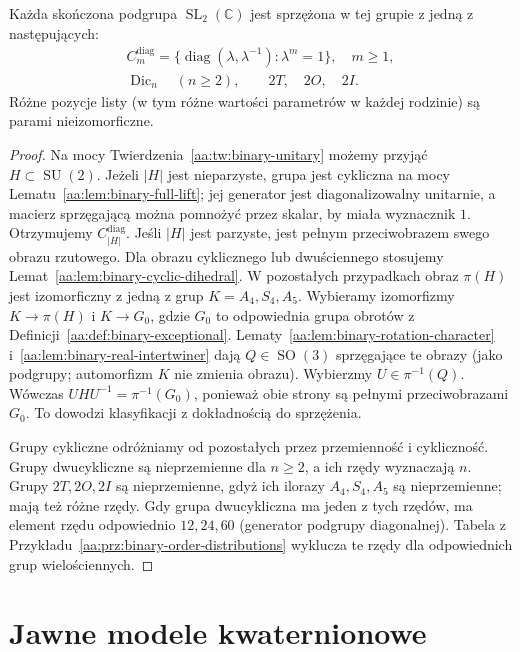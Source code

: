 \begin{twierdzenie}
\label{aa:tw:binary-classification}
Każda skończona podgrupa $\operatorname{SL}_2(\mathbb C)$
jest sprzężona w tej grupie z jedną z następujących:
\[
\begin{gathered}
 C_m^{\mathrm{diag}}=
 \{\operatorname{diag}(\lambda,\lambda^{-1}):\lambda^m=1\},
 \quad m\ge1,\\
 \operatorname{Dic}_n\quad(n\ge2),\qquad 2T,\quad 2O,\quad 2I.
\end{gathered}
\]
Różne pozycje listy (w tym różne wartości parametrów
w każdej rodzinie) są parami nieizomorficzne.
\end{twierdzenie}
\begin{proof}
Na mocy Twierdzenia~\ref{aa:tw:binary-unitary}
możemy przyjąć $H\subset\operatorname{SU}(2)$.
Jeżeli $|H|$ jest nieparzyste, grupa jest cykliczna
na mocy Lematu~\ref{aa:lem:binary-full-lift}; jej generator
jest diagonalizowalny unitarnie, a macierz sprzęgającą
można pomnożyć przez skalar, by miała wyznacznik $1$.
Otrzymujemy $C_{|H|}^{\mathrm{diag}}$.
Jeśli $|H|$ jest parzyste, jest pełnym przeciwobrazem
swego obrazu rzutowego. Dla obrazu cyklicznego lub
dwuściennego stosujemy Lemat~\ref{aa:lem:binary-cyclic-dihedral}.
W pozostałych przypadkach obraz $\pi(H)$ jest
izomorficzny z jedną z grup $K=A_4,S_4,A_5$.
Wybieramy izomorfizmy $K\to\pi(H)$ i $K\to G_0$,
gdzie $G_0$ to odpowiednia grupa obrotów
z Definicji~\ref{aa:def:binary-exceptional}.
Lematy~\ref{aa:lem:binary-rotation-character}
i~\ref{aa:lem:binary-real-intertwiner} dają
$Q\in\operatorname{SO}(3)$ sprzęgające te obrazy
(jako podgrupy; automorfizm $K$ nie zmienia obrazu).
Wybierzmy $U\in\pi^{-1}(Q)$. Wówczas
$UHU^{-1}=\pi^{-1}(G_0)$, ponieważ obie strony
są pełnymi przeciwobrazami $G_0$.
To dowodzi klasyfikacji z dokładnością do sprzężenia.

Grupy cykliczne odróżniamy od pozostałych przez
przemienność i cykliczność. Grupy dwucykliczne
są nieprzemienne dla $n\ge2$, a ich rzędy wyznaczają $n$.
Grupy $2T,2O,2I$ są nieprzemienne, gdyż ich ilorazy
$A_4,S_4,A_5$ są nieprzemienne; mają też różne rzędy.
Gdy grupa dwucykliczna ma jeden z tych rzędów,
ma element rzędu odpowiednio $12,24,60$ (generator
podgrupy diagonalnej). Tabela z
Przykładu~\ref{aa:prz:binary-order-distributions}
wyklucza te rzędy dla odpowiednich grup wielościennych.
\end{proof}

\section{Jawne modele kwaternionowe}

